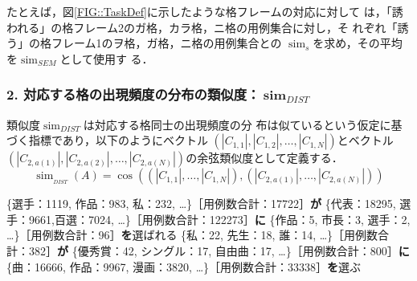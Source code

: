 \documentclass[japanese]{jnlp_1.4}
\begin{document}
   たとえば，図\ref{FIG::TaskDef}に示したような格フレームの対応に対して
   は，「誘われる」の格フレーム2のガ格，カラ格，ニ格の用例集合に対し，そ
   れぞれ「誘う」の格フレーム1のヲ格，ガ格，ニ格の用例集合との
   $\operatorname{sim}_s$を求め，その平均を$\operatorname{sim}_{SEM}$として使用す
   る．


\subsubsection*{2. 対応する格の出現頻度の分布の類似度：$\boldsymbol{\operatorname{sim}_\mathit{DIST}}$}

   類似度$\operatorname{sim}_{DIST}$は対応する格同士の出現頻度の分
   布は似ているという仮定に基づく指標であり，以下のようにベクトル
   $(|C_{1,1}|, |C_{1,2}|, \dots, |C_{1,N}|)$とベクトル$(|C_{2,a(1)}|,
   |C_{2,a(2)}|, \dots,|C_{2,a(N)}|)$の余弦類似度として定義する．
\[
  \operatorname{sim}_{_{DIST}}(A)=\cos((|C_{1,1}|, \dots, |C_{1,N}|),
    (|C_{2,a(1)}|, \dots, |C_{2,a(N)}|))
\]
\begin{exe}
	\label{EX::ERABA}
 \sn \{選手：1119, 作品：983, 私：232, …\}{\footnotesize ［用例数合計：17722］}\textbf{が}
 \sn \{代表：18295, 選手：9661,百選：7024, …\}{\footnotesize ［用例数合計：122273］}\textbf{に}
 \sn \{作品：5, 市長：3, 選手：2, …\}{\footnotesize ［用例数合計：96］}\textbf{を}選ばれる
	\label{EX::ERABU}
 \sn \{私：22, 先生：18, 誰：14, …\}{\footnotesize ［用例数合計：382］}\textbf{が}
 \sn \{優秀賞：42, シングル：17, 自由曲：17,  …\}{\footnotesize ［用例数合計：800］}\textbf{に}
 \sn  \{曲：16666, 作品：9967, 漫画：3820, …\}{\footnotesize ［用例数合計：33338］}\textbf{を}選ぶ
\end{exe}
\end{document}
